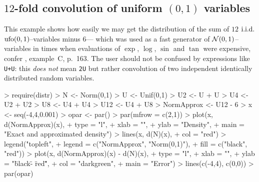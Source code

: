 \documentclass[11pt]{article}
\begin{document}
\subsection{$12$-fold convolution of uniform $(0,1)$ variables}
\begin{small}
  This example shows how easily we may get the distribution of the sum of $12$
  ${\rm i.i.d.}$ ${\rm ufo}(0,1)$--variables minus $6$--- which was used as a
  fast generator of ${\cal N}(0,1)$--variables in times when evaluations of
  $\exp$, $\log$, $\sin$ and $\tan$ were expensive, confer
  \cite{Ric:88}, example~C, p.~163. The user should not be confused by
   expressions  like {\tt U+U}: this {\em does not\/} mean {\tt 2U}
  but rather convolution of two independent identically distributed
  random variables.
\end{small}
\begin{Schunk}
\begin{Sinput}
> require(distr)
> N <- Norm(0,1)
> U <- Unif(0,1)
> U2 <- U + U
> U4 <- U2 + U2
> U8 <- U4 + U4
> U12 <- U4 + U8
> NormApprox <- U12 - 6
> x <- seq(-4,4,0.001)
> opar <- par()
> par(mfrow = c(2,1))
> plot(x, d(NormApprox)(x),
+      type = "l",
+      xlab = "",
+      ylab = "Density",
+      main = "Exact and approximated density")
> lines(x, d(N)(x),
+       col = "red")
> legend("topleft",
+        legend = c("NormApprox", "Norm(0,1)"),
+        fill = c("black", "red"))
> plot(x, d(NormApprox)(x) - d(N)(x),
+      type = "l",
+      xlab = "",
+      ylab = "\"black\" - \"red\"",
+      col = "darkgreen",
+      main = "Error")
> lines(c(-4,4), c(0,0))
> par(opar)
\end{Sinput}
\end{Schunk}
\end{document}
